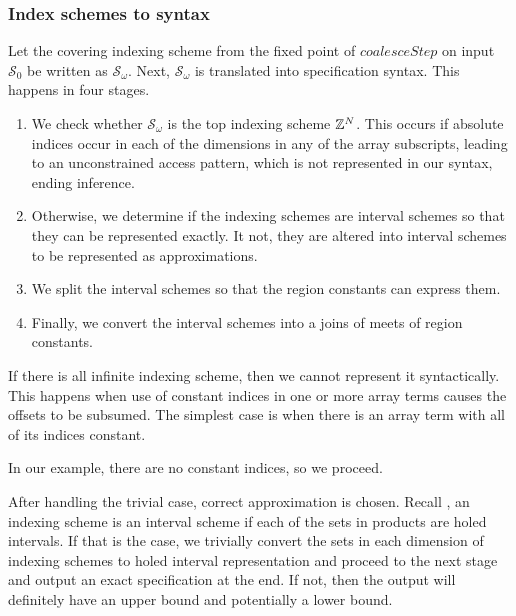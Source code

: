 \subsubsection{Index schemes to syntax}

\newcommand{\finalSet}{\mathcal{S}_\omega}
Let the covering indexing scheme from the fixed point of
$\mathit{coalesceStep}$ on input $\mathcal{S}_0$ be written as
$\finalSet{}$.  Next, $\finalSet{}$ is translated into specification
syntax. This happens in four stages.

\begin{enumerate}[leftmargin=1.5em]
  \item We check whether $\finalSet{}$
  is the top indexing scheme $\textnormal{$\mathbb{Z}$}{}^N$. This occurs if absolute indices
  occur in each of the dimensions in any of the array subscripts,
  leading to an unconstrained access pattern, which is not represented
  in our syntax, ending inference.

  \item Otherwise, we determine if the indexing schemes are interval
  schemes so that they can be represented exactly. It not, they are
  altered into interval schemes to be represented as approximations.

  \item We split the interval schemes so that the region constants can
  express them.

  \item Finally, we convert the interval schemes into a joins of meets
  of region constants.
\end{enumerate}

If there is all infinite indexing scheme, then we cannot represent it
syntactically. This happens when use of constant indices in one or more array
terms causes the offsets to be subsumed. The simplest case is when there is an
array term with all of its indices constant.

In our example, there are no constant indices, so we proceed.

After handling the trivial case, correct approximation is chosen. Recall
, an indexing scheme is an interval scheme if each of
the sets in products are holed intervals. If that is the case, we trivially
convert the sets in each dimension of indexing schemes to holed interval
representation and proceed to the next stage and output an exact specification
at the end. If not, then the output will definitely have an upper bound and
potentially a lower bound.

